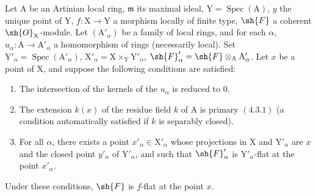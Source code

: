 \begin{proposition}[11.4.11]
\label{IV.11.4.11}
Let $\mathrm{A}$ be an Artinian local ring, $\mathfrak{m}$ its maximal ideal,
$\mathrm{Y}=\operatorname{Spec}(\mathrm{A})$, $y$ the unique point of $\mathrm{Y}$, $f:\mathrm{X}\to\mathrm{Y}$ a morphism locally of finite type, $\sh{F}$ a
coherent $\sh{O}_\mathrm{X}$-module. Let $(\mathrm{A}'_\alpha)$ be a family of local rings, and for each $\alpha$, $u_\alpha:\mathrm{A}\to\mathrm{A}'_\alpha$
a homomorphism of rings (necessarily local). Set $\mathrm{Y}'_\alpha=\operatorname{Spec}(\mathrm{A}'_\alpha)$, $\mathrm{X}'_\alpha=\mathrm{X}\times_\mathrm{Y}\mathrm{Y}'_\alpha$,
$\sh{F}'_\alpha=\sh{F}\otimes_\mathrm{A}\mathrm{A}'_\alpha$. Let $x$ be a point
of $\mathrm{X}$, and suppose the following conditions are satisfied:
\begin{enumerate}[label=(\roman*)]
  \item The intersection of the kernels of the $u_\alpha$ is reduced to $0$.
  \item The extension $k(x)$ of the residue field $k$ of $\mathrm{A}$ is primary $(4.3.1)$ (a condition automatically
  satisfied if $k$ is separably closed).
\end{enumerate}
\begin{enumerate}[label=(\roman*)]
  \setcounter{enumi}{2}
  \item For all $\alpha$, there exists a point $x'_\alpha\in\mathrm{X}'_\alpha$ whose projections in $\mathrm{X}$ and $\mathrm{Y}'_\alpha$
  are $x$ and the closed point $y'_\alpha$ of $\mathrm{Y}'_\alpha$, and such that $\sh{F}'_\alpha$ is $\mathrm{Y}'_\alpha$-flat at the point $x'_\alpha$.
\end{enumerate}

Under these conditions, $\sh{F}$ is $f$-flat at the point $x$.
\end{proposition}

